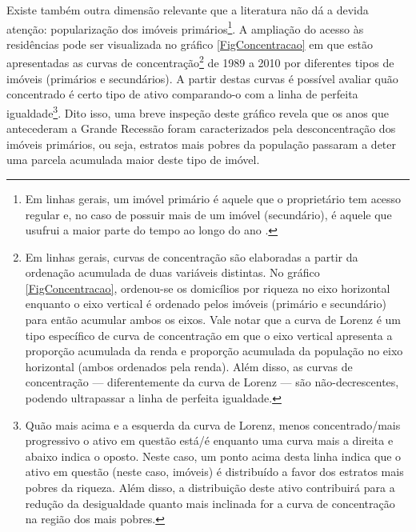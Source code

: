 

Existe também outra dimensão relevante que a literatura não dá a devida atenção: popularização dos imóveis primários\footnote{
	Em linhas gerais, um imóvel primário é aquele que o proprietário tem acesso regular e, no caso de possuir mais de um imóvel (secundário), é aquele que usufrui a maior parte do tempo ao longo do ano \cite{us_census_bureau_characteristics_2017}.
}.
A ampliação do acesso às residências pode ser visualizada no gráfico \ref{FigConcentracao} em que estão apresentadas as curvas de concentração\footnote{Em linhas gerais, curvas de concentração são elaboradas a partir da ordenação acumulada de duas variáveis distintas. No gráfico \ref{FigConcentracao}, ordenou-se os domicílios por riqueza no eixo horizontal enquanto o eixo vertical é ordenado pelos imóveis (primário e secundário) para então acumular ambos os eixos. Vale notar que a curva de Lorenz é um tipo específico de curva de concentração em que o eixo vertical apresenta a proporção acumulada da renda e proporção acumulada da população no eixo horizontal (ambos ordenados pela renda). Além disso, as curvas de concentração --- diferentemente da curva de Lorenz --- são não-decrescentes, podendo ultrapassar a linha de perfeita igualdade.
} de 1989 a 2010 por diferentes tipos de imóveis (primários e secundários).
A partir destas curvas é possível avaliar quão concentrado é certo tipo de ativo comparando-o com a linha de perfeita igualdade\footnote{Quão mais acima e a esquerda da curva de Lorenz, menos concentrado/mais progressivo o ativo em questão está/é enquanto uma curva mais a direita e abaixo indica o oposto.
Neste caso, um ponto acima desta linha indica que o ativo em questão (neste caso, imóveis) é distribuído a favor dos estratos mais pobres da riqueza.
Além disso, a distribuição deste ativo contribuirá para a redução da desigualdade quanto mais inclinada for a curva de concentração na região dos mais pobres.
}.
Dito isso, uma breve inspeção deste gráfico revela que os anos que antecederam a Grande Recessão foram caracterizados pela desconcentração dos imóveis primários, ou seja, estratos mais pobres da população passaram a deter uma parcela acumulada maior deste tipo de imóvel.

